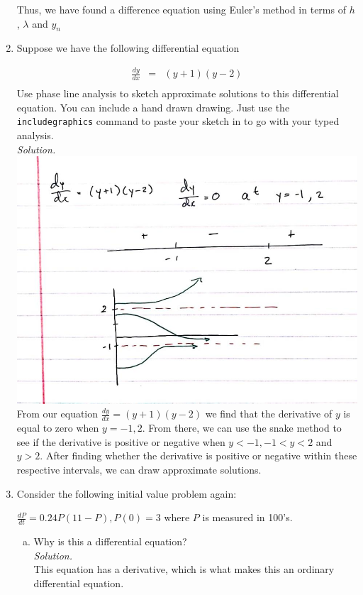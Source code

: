 \documentclass[12pt,letterpaper]{article}
\begin{document}
\begin{enumerate}
Thus, we have found a difference equation using Euler's method in terms of 
$h$, $\lambda$ and $y_{n}$

\item Suppose we have the following differential equation
 
 \begin{eqnarray*}
 \frac{dy}{dx} &=& (y+1)(y-2)\\
\end{eqnarray*} 
Use phase line analysis to sketch approximate solutions to this differential equation. You can include a hand drawn drawing. Just use the {\tt includegraphics} command to paste your sketch in to go with your typed analysis.\\
\emph{Solution.} \\
\includegraphics[scale = .3]{number4.jpg}\\
From our equation $\frac{dy}{dx} = (y+1)(y-2)$ we find that the derivative of $y$
is equal to zero when $y = -1, 2$. From there, we can use the snake method to 
see if the derivative is positive or negative when $y < -1, -1<y<2$ and $y > 2$. 
After finding whether the derivative is positive or negative within these respective
intervals, we can draw approximate solutions. 

\item Consider the following initial value problem again:

$\frac{dP}{dt}=0.24P(11-P), P(0)=3$ where $P$ is measured in 100's.

\begin{enumerate}[a)]
\item Why is this a differential equation?\\
\emph{Solution.} \\
This equation has a derivative, which is what makes this an ordinary differential equation. 


\end{enumerate}
\end{enumerate}
\end{document}
